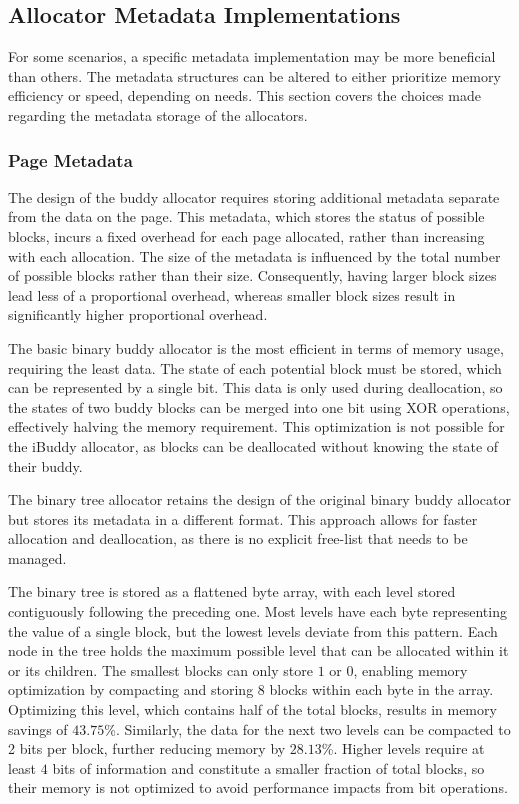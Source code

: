 \subsection{Allocator Metadata Implementations} \label{sec:adaptationsmetadata}
For some scenarios, a specific metadata implementation may be more beneficial than others. The metadata structures can be altered to either prioritize memory efficiency or speed, depending on needs. This section covers the choices made regarding the metadata storage of the allocators.

\subsubsection{Page Metadata} \label{sec:metadataexpl}

The design of the buddy allocator requires storing additional metadata separate from the data on the page. This metadata, which stores the status of possible blocks, incurs a fixed overhead for each page allocated, rather than increasing with each allocation. The size of the metadata is influenced by the total number of possible blocks rather than their size. Consequently, having larger block sizes lead less of a proportional overhead, whereas smaller block sizes result in significantly higher proportional overhead.

The basic binary buddy allocator is the most efficient in terms of memory usage, requiring the least data. The state of each potential block must be stored, which can be represented by a single bit. This data is only used during deallocation, so the states of two buddy blocks can be merged into one bit using XOR operations, effectively halving the memory requirement. This optimization is not possible for the iBuddy allocator, as blocks can be deallocated without knowing the state of their buddy.

The binary tree allocator retains the design of the original binary buddy allocator but stores its metadata in a different format. This approach allows for faster allocation and deallocation, as there is no explicit free-list that needs to be managed.

The binary tree is stored as a flattened byte array, with each level stored contiguously following the preceding one. Most levels have each byte representing the value of a single block, but the lowest levels deviate from this pattern. Each node in the tree holds the maximum possible level that can be allocated within it or its children. The smallest blocks can only store $1$ or $0$, enabling memory optimization by compacting and storing 8 blocks within each byte in the array. Optimizing this level, which contains half of the total blocks, results in memory savings of $43.75$\%. Similarly, the data for the next two levels can be compacted to 2 bits per block, further reducing memory by $28.13$\%. Higher levels require at least $4$ bits of information and constitute a smaller fraction of total blocks, so their memory is not optimized to avoid performance impacts from bit operations.

